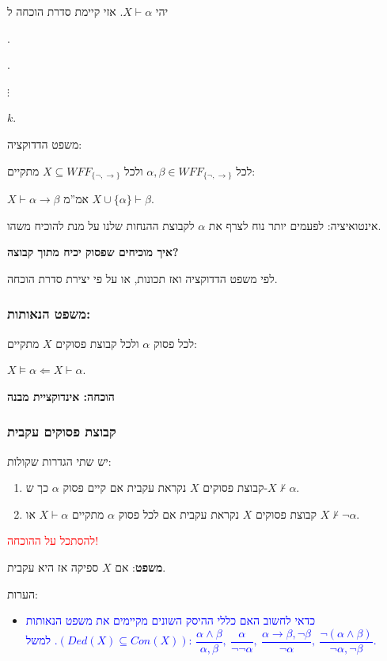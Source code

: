 \documentclass[12pt,a4paper]{article}
\begin{document}
יהי $X\vdash\alpha$. אזי קיימת סדרת הוכחה ל

.

.

$\vdots$

\noindent $k$.

משפט הדדוקציה:

לכל $\alpha,\beta\in WFF_{\{\lnot,\rightarrow\}}$ ולכל $X\subseteq WFF_{\{\lnot,\rightarrow\}}$ מתקיים:

$X\vdash\alpha\rightarrow\beta$ אמ''מ $X\cup\{\alpha\}\vdash\beta$.

אינטואיציה: לפעמים יותר נוח לצרף את $\alpha$ לקבוצת ההנחות שלנו על מנת להוכיח משהו.

\textbf{איך מוכיחים שפסוק יכיח מתוך קבוצה?}

לפי משפט הדדוקציה ואז תכונות, או על פי יצירת סדרת הוכחה.

\subsubsection*{משפט הנאותות:}

לכל פסוק $\alpha$ ולכל קבוצת פסוקים $X$ מתקיים:

$X\vDash\alpha\Leftarrow X\vdash\alpha$.

\textbf{הוכחה: אינדוקציית מבנה}

\subsubsection*{קבוצת פסוקים עקבית}

יש שתי הגדרות שקולות:

\begin{enumerate}
  \item קבוצת פסוקים $X$ נקראת עקבית אם קיים פסוק $\alpha$ כך ש-$X\nvdash\alpha$.
  \item קבוצת פסוקים $X$ נקראת עקבית אם לכל פסוק $\alpha$ מתקיים $X\vdash\alpha$ או $X\nvdash\lnot\alpha$.
\end{enumerate}

\textcolor{red}{להסתכל על ההוכחה!}

\textbf{משפט}: אם $X$ ספיקה אז היא עקבית.

הערות:

\begin{itemize}
  \item \textcolor{blue}{כדאי לחשוב האם כללי ההיסק השונים מקיימים את משפט הנאותות $(Ded(X)\subseteq Con(X))$. למשל: $\dfrac{\alpha\wedge\beta}{\alpha,\beta},\ \dfrac{\alpha}{\lnot\lnot\alpha},\ \dfrac{\alpha\rightarrow\beta,\lnot\beta}{\lnot\alpha},\ \dfrac{\lnot(\alpha\land\beta)}{\lnot\alpha,\lnot\beta}$.}
\end{itemize}
\end{document}
